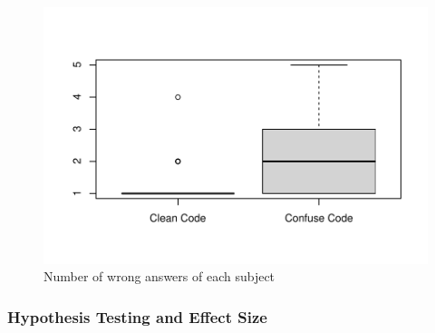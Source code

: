 

\begin{figure}[htb!]
\noindent
 \centering
 \includegraphics[width=\columnwidth]{images/wrong-answers-plot-1.pdf}
 \caption{Number of wrong answers of each subject}
 \label{fig:boxplotcorrectness}
 \end{figure}


\subsubsection*{Hypothesis Testing and Effect Size}

